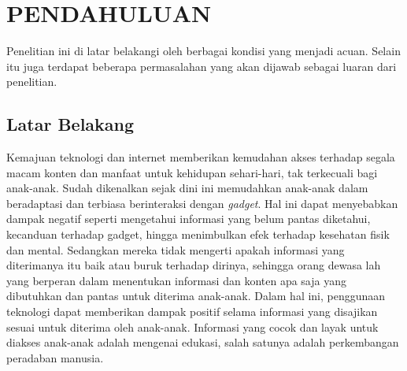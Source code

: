 \chapter{PENDAHULUAN}
\vspace{4ex}

\hspace{\parindent} Penelitian ini di latar belakangi oleh berbagai kondisi yang menjadi acuan. Selain itu juga terdapat beberapa permasalahan yang akan dijawab sebagai luaran dari penelitian.
\vspace{2ex}

\section{Latar Belakang}
\vspace{1ex}
	Kemajuan teknologi dan internet memberikan kemudahan akses terhadap segala macam konten dan manfaat untuk kehidupan sehari-hari, tak terkecuali bagi anak-anak. Sudah dikenalkan sejak dini ini memudahkan anak-anak dalam beradaptasi dan terbiasa berinteraksi dengan \textit{gadget}. Hal ini dapat menyebabkan dampak negatif seperti mengetahui informasi yang belum pantas diketahui, kecanduan terhadap gadget, hingga menimbulkan efek terhadap kesehatan fisik dan mental\cite{sundus2018impact}. Sedangkan mereka tidak mengerti apakah informasi yang diterimanya itu baik atau buruk terhadap dirinya, sehingga orang dewasa lah yang berperan dalam menentukan informasi dan konten apa saja yang dibutuhkan dan pantas untuk diterima anak-anak. Dalam hal ini, penggunaan teknologi dapat memberikan dampak positif selama informasi yang disajikan sesuai untuk diterima oleh anak-anak. Informasi yang cocok dan layak untuk diakses anak-anak adalah mengenai edukasi, salah satunya adalah perkembangan peradaban manusia. 
	
